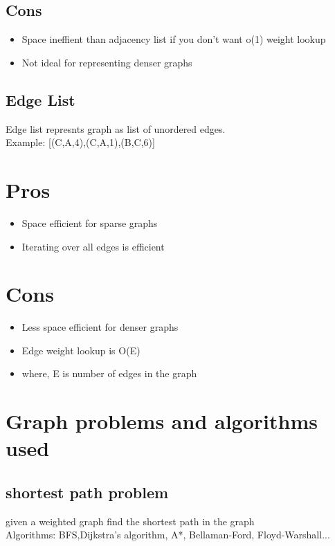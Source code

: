 \documentclass[12pt]{extarticle}
\begin{document}
\subsection*{Cons}
\begin{itemize}
    \item Space ineffient than adjacency list if you don't want o(1) weight lookup
    \item Not ideal for representing denser graphs
\end{itemize}

\subsection{Edge List}
Edge list represnts graph as list of unordered edges. \\
Example: [(C,A,4),(C,A,1),(B,C,6)]

\section*{Pros}
\begin{itemize}
    \item Space efficient for sparse graphs
    \item Iterating over all edges is efficient
\end{itemize}

\section{Cons}
\begin{itemize}
    \item Less space efficient for denser graphs
    \item Edge weight lookup is O(E)
    \item where, E is number of edges in the graph
\end{itemize}


\section{Graph problems and algorithms used}
\subsection{shortest path problem}
given a weighted graph find the shortest path in the graph \\
Algorithms: BFS,Dijkstra's algorithm, A*, Bellaman-Ford, Floyd-Warshall...
\end{document}
